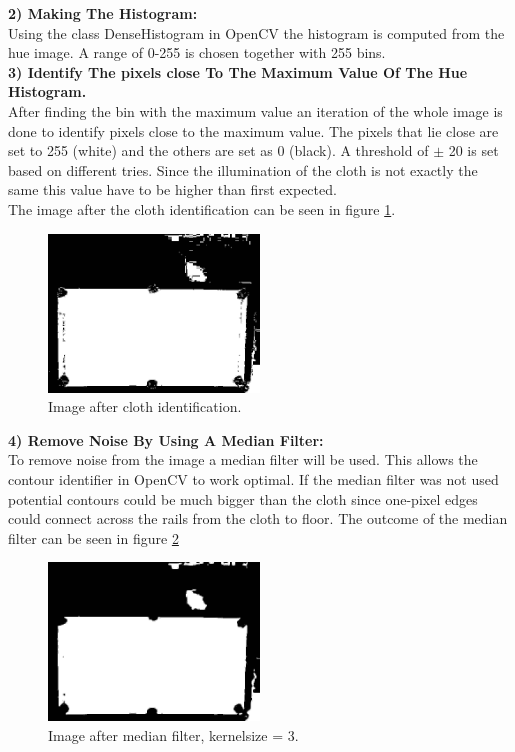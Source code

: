 \textbf{2) Making The Histogram:}\\
Using the class DenseHistogram in OpenCV the histogram is computed from the hue image. A range of 0-255 is chosen together with 255 bins.\\

\textbf{3) Identify The pixels close To The Maximum Value Of The Hue Histogram.}\\
After finding the bin with the maximum value an iteration of the whole image is done to identify pixels close to the maximum value. The pixels that lie close are set to 255 (white) and the others are set as 0 (black). A threshold of $\pm$ 20 is set based on different tries. Since the illumination of the cloth is not exactly the same this value have to be higher than first expected.\\

The image after the cloth identification can be seen in figure \ref{fig:aftercloth}.

\begin{figure}[H]
\begin{center}
\leavevmode
\includegraphics[width=0.5\textwidth]{images/aftercloth}
\end{center}
\caption{Image after cloth identification.}
\label{fig:aftercloth}
\end{figure}

\textbf{4) Remove Noise By Using A Median Filter:}\\
To remove noise from the image a median filter will be used. This allows the contour identifier in OpenCV to work optimal. If the median filter was not used potential contours could be much bigger than the cloth since one-pixel edges could connect across the rails from the cloth to floor. The outcome of the median filter can be seen in figure \ref{fig:afterclothmedian}

\begin{figure}[H]
\begin{center}
\leavevmode
\includegraphics[width=0.5\textwidth]{images/afterclothmedian}
\end{center}
\caption{Image after median filter, kernelsize = 3.}
\label{fig:afterclothmedian}
\end{figure}

